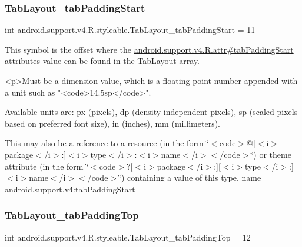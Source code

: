 \subsubsection{\texorpdfstring{Tab\+Layout\+\_\+tab\+Padding\+Start}{TabLayout\_tabPaddingStart}}
{\footnotesize\ttfamily int android.\+support.\+v4.\+R.\+styleable.\+Tab\+Layout\+\_\+tab\+Padding\+Start = 11\hspace{0.3cm}{\ttfamily [static]}}

This symbol is the offset where the \hyperlink{classandroid_1_1support_1_1v4_1_1R_1_1attr_a4a489149b8ed97ee692ee9e9dbd14715}{android.\+support.\+v4.\+R.\+attr\#tab\+Padding\+Start} attribute\textquotesingle{}s value can be found in the \hyperlink{classandroid_1_1support_1_1v4_1_1R_1_1styleable_a48e866d7121b40ef0bb3d467759606a9}{Tab\+Layout} array.

\begin{DoxyVerb}      <p>Must be a dimension value, which is a floating point number appended with a unit such as "<code>14.5sp</code>".
\end{DoxyVerb}
 Available units are\+: px (pixels), dp (density-\/independent pixels), sp (scaled pixels based on preferred font size), in (inches), mm (millimeters). 

This may also be a reference to a resource (in the form \char`\"{}$<$code$>$@\mbox{[}$<$i$>$package$<$/i$>$\+:\mbox{]}$<$i$>$type$<$/i$>$\+:$<$i$>$name$<$/i$>$$<$/code$>$\char`\"{}) or theme attribute (in the form \char`\"{}$<$code$>$?\mbox{[}$<$i$>$package$<$/i$>$\+:\mbox{]}\mbox{[}$<$i$>$type$<$/i$>$\+:\mbox{]}$<$i$>$name$<$/i$>$$<$/code$>$\char`\"{}) containing a value of this type.  name android.\+support.\+v4\+:tab\+Padding\+Start \mbox{\label{classandroid_1_1support_1_1v4_1_1R_1_1styleable_a5eb6cfc8bb3bdd5e021b1b208a6e4eca}} 
\subsubsection{\texorpdfstring{Tab\+Layout\+\_\+tab\+Padding\+Top}{TabLayout\_tabPaddingTop}}
{\footnotesize\ttfamily int android.\+support.\+v4.\+R.\+styleable.\+Tab\+Layout\+\_\+tab\+Padding\+Top = 12\hspace{0.3cm}{\ttfamily [static]}}

